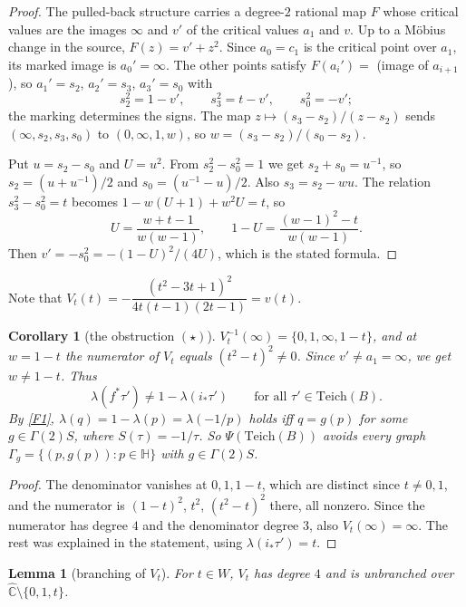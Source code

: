 \documentclass[11pt]{article}
\newtheorem{lemma}[proposition]{Lemma}
\newtheorem{corollary}[proposition]{Corollary}
\theoremstyle{definition}
\newcommand{\Teich}{\mathrm{Teich}}
\newcommand{\Ch}{\hat{\mathbb C}}
\newcommand{\HH}{\mathbb H}
\begin{document}
\begin{proof}
The pulled-back structure carries a degree-$2$ rational map $F$ whose critical values are the images $\infty$ and $v'$ of the critical values $a_1$ and $v$. Up to a M\"obius change in the source, $F(z)=v'+z^2$. Since $a_0=c_1$ is the critical point over $a_1$, its marked image is $a_0'=\infty$. The other points satisfy $F(a_i')=$ (image of $a_{i+1}$), so $a_1'=s_2$, $a_2'=s_3$, $a_3'=s_0$ with
\[s_2^2=1-v',\qquad s_3^2=t-v',\qquad s_0^2=-v';\]
the marking determines the signs. The map $z\mapsto(s_3-s_2)/(z-s_2)$ sends $(\infty,s_2,s_3,s_0)$ to $(0,\infty,1,w)$, so $w=(s_3-s_2)/(s_0-s_2)$.

Put $u=s_2-s_0$ and $U=u^2$. From $s_2^2-s_0^2=1$ we get $s_2+s_0=u^{-1}$, so $s_2=(u+u^{-1})/2$ and $s_0=(u^{-1}-u)/2$. Also $s_3=s_2-wu$. The relation $s_3^2-s_0^2=t$ becomes $1-w(U+1)+w^2U=t$, so
\[U=\frac{w+t-1}{w(w-1)},\qquad 1-U=\frac{(w-1)^2-t}{w(w-1)}.\]
Then $v'=-s_0^2=-(1-U)^2/(4U)$, which is the stated formula.
\end{proof}

Note that $V_t(t)=-\dfrac{(t^2-3t+1)^2}{4t(t-1)(2t-1)}=v(t)$.

\begin{corollary}[the obstruction $(\star)$]\label{cor:star}
$V_t^{-1}(\infty)=\{0,1,\infty,1-t\}$, and at $w=1-t$ the numerator of $V_t$ equals $(t^2-t)^2\ne0$. Since $v'\ne a_1=\infty$, we get $w\ne1-t$. Thus
\[\lambda(f^*\tau')\ne1-\lambda(i_*\tau')\qquad\text{for all }\tau'\in\Teich(B). \tag{$\star$}\]
By \ref{F1}, $\lambda(q)=1-\lambda(p)=\lambda(-1/p)$ holds iff $q=g(p)$ for some $g\in\Gamma(2)S$, where $S(\tau)=-1/\tau$. So $\Psi(\Teich(B))$ avoids every graph $\Gamma_g=\{(p,g(p)):p\in\HH\}$ with $g\in\Gamma(2)S$.
\end{corollary}

\begin{proof}
The denominator vanishes at $0,1,1-t$, which are distinct since $t\ne0,1$, and the numerator is $(1-t)^2$, $t^2$, $(t^2-t)^2$ there, all nonzero. Since the numerator has degree $4$ and the denominator degree $3$, also $V_t(\infty)=\infty$. The rest was explained in the statement, using $\lambda(i_*\tau')=t$.
\end{proof}

\begin{lemma}[branching of $V_t$]\label{lem:branch}
For $t\in W$, $V_t$ has degree $4$ and is unbranched over $\Ch\setminus\{0,1,t\}$.
\end{lemma}
\end{document}
